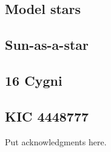 \documentclass[linenumbers,modern,astrosymb,times]{aastex631}
\begin{document}
\subsection{Model stars}\label{sec:model-stars}




\subsection{Sun-as-a-star}\label{sec:sun}




\subsection{16 Cygni}\label{sec:16cyg}




\subsection{KIC 4448777}\label{sec:boeing}



\begin{acknowledgments}
    Put acknowledgments here.
\end{acknowledgments}

%

\vspace{5mm}

\end{document}
